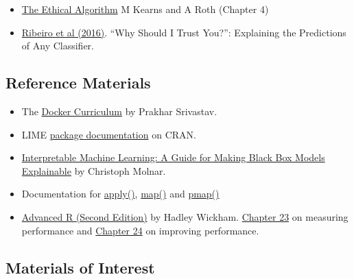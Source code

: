 \documentclass[
  12pt,
]{book}
\begin{document}
\begin{itemize}
\item
  \href{https://library-search.imperial.ac.uk/discovery/fulldisplay?docid=alma991000531083101591\&context=L\&vid=44IMP_INST:ICL_VU1\&lang=en\&search_scope=MyInst_and_CI\&adaptor=Local\%20Search\%20Engine\&tab=Everything\&query=any,contains,kearns\%20and\%20roth\&mode=Basic}{The Ethical Algorithm} M Kearns and A Roth (Chapter 4)
\item
  \href{https://arxiv.org/abs/1602.04938}{Ribeiro et al (2016)}. ``Why Should I Trust You?'': Explaining the Predictions of Any Classifier.
\end{itemize}

\hypertarget{reference-materials-2}{%
\subsection*{Reference Materials}\label{reference-materials-2}}

\begin{itemize}
\item
  The \href{https://docker-curriculum.com/}{Docker Curriculum} by Prakhar Srivastav.
\item
  LIME \href{https://cran.r-project.org/web/packages/lime/index.html}{package documentation} on CRAN.
\item
  \href{https://christophm.github.io/interpretable-ml-book/}{Interpretable Machine Learning: A Guide for Making Black Box Models Explainable} by Christoph Molnar.
\item
  Documentation for \href{https://www.rdocumentation.org/packages/base/versions/3.6.2/topics/apply}{apply()}, \href{https://purrr.tidyverse.org/reference/map.html}{map()} and \href{https://furrr.futureverse.org/}{pmap()}
\item
  \href{https://adv-r.hadley.nz/index.html}{Advanced R (Second Edition)} by Hadley Wickham. \href{https://adv-r.hadley.nz/perf-measure.html}{Chapter 23} on measuring performance and \href{https://adv-r.hadley.nz/perf-improve.html}{Chapter 24} on improving performance.
\end{itemize}

\hypertarget{materials-of-interest-3}{%
\subsection*{Materials of Interest}\label{materials-of-interest-3}}
\end{document}
